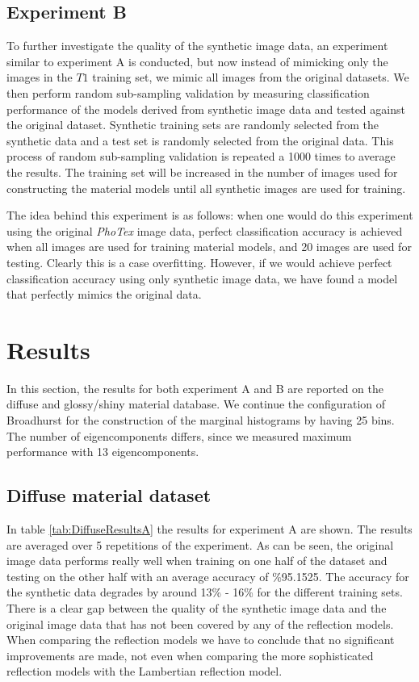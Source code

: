 \subsection{Experiment B}
To further investigate the quality of the synthetic image data, an experiment similar to experiment A is conducted, but now instead of mimicking only the images in the $T1$ training set, we mimic all images from the original datasets. We then perform random sub-sampling validation by measuring classification performance of the models derived from synthetic image data and tested against the original dataset. Synthetic training sets are randomly selected from the synthetic data and a test set is randomly selected from the original data. This process of random sub-sampling validation is repeated a 1000 times to average the results. The training set will be increased in the number of images used for constructing the material models until all synthetic images are used for training. 

The idea behind this experiment is as follows: when one would do this experiment using the original {\it PhoTex} image data, perfect classification accuracy is achieved when all images are used for training material models, and 20 images are used for testing. Clearly this is a case overfitting. However, if we would achieve perfect classification accuracy using only synthetic image data, we have found a model that perfectly mimics the original data. 

\section{Results}\label{sec:Results}
In this section, the results for both experiment A and B are reported on the diffuse and glossy/shiny material database. We continue the configuration of Broadhurst for the construction of the marginal histograms by having 25 bins. The number of eigencomponents differs, since we measured maximum performance with 13 eigencomponents.

\subsection{Diffuse material dataset}
In table \ref{tab:DiffuseResultsA} the results for experiment A are shown. The results are averaged over 5 repetitions of the experiment. As can be seen, the original image data performs really well when training on one half of the dataset and testing on the other half with an average accuracy of \%95.1525. The accuracy for the synthetic data degrades by around 13\% - 16\% for the different training sets. There is a clear gap between the quality of the synthetic image data and the original image data that has not been covered by any of the reflection models. When comparing the reflection models we have to conclude that no significant improvements are made, not even when comparing the more sophisticated reflection models with the Lambertian reflection model. 
 
